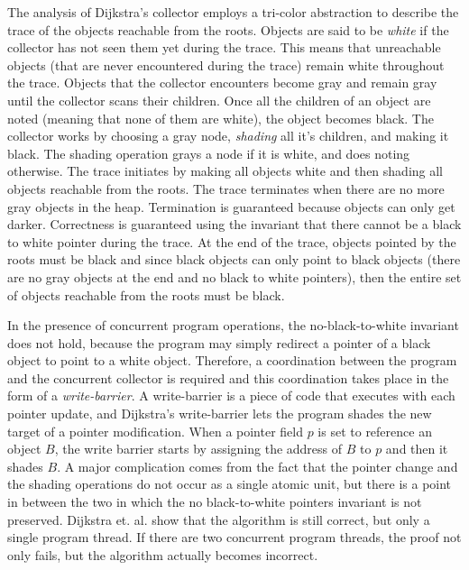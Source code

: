 The analysis of Dijkstra's collector employs a tri-color abstraction to describe the trace of the objects reachable from the roots. Objects are said to be {\em white} if the collector has not seen them yet during the trace. This means that unreachable objects (that are never encountered during the trace) remain white throughout the trace. Objects that the collector encounters become gray and remain gray until the collector scans their children. Once all the children of an object are noted (meaning that none of them are white), the object becomes black. The collector works by choosing a gray node, {\em shading} all it's children, and making it black. The shading operation grays a node if it is white, and does noting otherwise. The trace initiates by making all objects white and then shading all objects reachable from the roots. The trace terminates when there are no more gray objects in the heap. Termination is guaranteed because objects can only get darker. Correctness is guaranteed using the invariant that there cannot be a black to white pointer during the trace. At the end of the trace, objects pointed by the roots must be black and since black objects can only point to black objects (there are no gray objects at the end and no black to white pointers), then the entire set of objects reachable from the roots must be black.

In the presence of concurrent program operations, the no-black-to-white invariant does not hold, because the program may simply redirect a pointer of a black object to point to a white object. Therefore, a coordination between the program and the concurrent collector is required and this coordination takes place in the form of a {\em write-barrier}. A write-barrier is a piece of code that executes with each pointer update, and Dijkstra's write-barrier lets the program shades the new target of a pointer modification.  When a pointer field $p$ is set to reference an object $B$, the write barrier starts by assigning the address of $B$ to $p$ and then it shades $B$. A major complication comes from the fact that the pointer change and the shading operations do not occur as a single atomic unit, but there is a point in between the two in which the no black-to-white pointers invariant is not preserved. Dijkstra et. al. show that the algorithm is still correct, but only a single program thread. If there are two concurrent program threads, the proof not only fails, but the algorithm actually becomes incorrect. 

